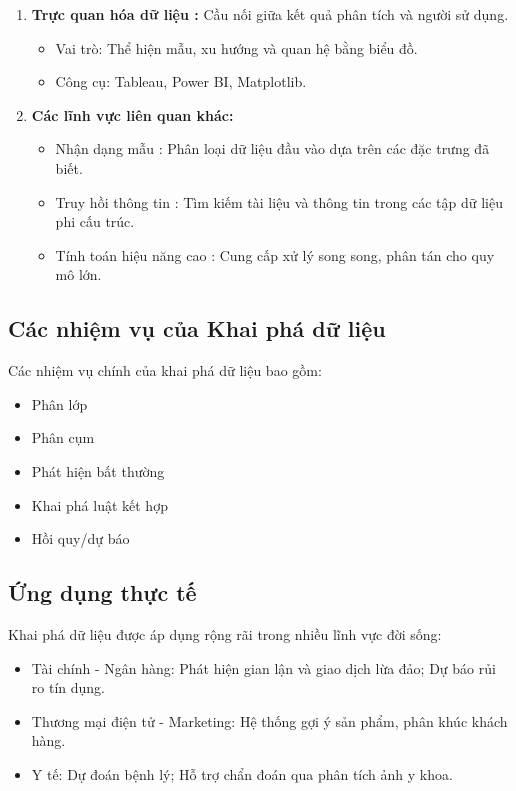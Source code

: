 \begin{enumerate}
    \item \textbf{Trực quan hóa dữ liệu :} Cầu nối giữa kết quả phân tích và người sử dụng.
    \begin{itemize}
        \item Vai trò: Thể hiện mẫu, xu hướng và quan hệ bằng biểu đồ.
        \item Công cụ: Tableau, Power BI, Matplotlib.
    \end{itemize}

    \item \textbf{Các lĩnh vực liên quan khác:}
    \begin{itemize}
        \item Nhận dạng mẫu : Phân loại dữ liệu đầu vào dựa trên các đặc trưng đã biết.
        \item Truy hồi thông tin : Tìm kiếm tài liệu và thông tin trong các tập dữ liệu phi cấu trúc.
        \item Tính toán hiệu năng cao : Cung cấp xử lý song song, phân tán cho quy mô lớn.
    \end{itemize}
\end{enumerate}

\subsection{Các nhiệm vụ của Khai phá dữ liệu}
Các nhiệm vụ chính của khai phá dữ liệu bao gồm:
\begin{itemize}
    \item Phân lớp
    \item Phân cụm
    \item Phát hiện bất thường
    \item Khai phá luật kết hợp
    \item Hồi quy/dự báo
\end{itemize}

\subsection{Ứng dụng thực tế}
Khai phá dữ liệu được áp dụng rộng rãi trong nhiều lĩnh vực đời sống:
\begin{itemize}
    \item Tài chính - Ngân hàng: Phát hiện gian lận và giao dịch lừa đảo; Dự báo rủi ro tín dụng.
    \item Thương mại điện tử - Marketing: Hệ thống gợi ý sản phẩm, phân khúc khách hàng.
    \item Y tế: Dự đoán bệnh lý; Hỗ trợ chẩn đoán qua phân tích ảnh y khoa.
\end{itemize}

